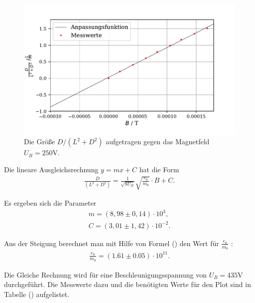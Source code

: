 \begin{figure}[H]
  \centering
  \includegraphics{plot1.pdf}
  \caption{Die Größe $D/(L^2+D^2)$ aufgetragen gegen das Magnetfeld $U_B = 250\si{\volt}$.}
  \label{fig:plot}
\end{figure}

Die lineare Ausgleichsrechnung $y = mx+C$ hat die Form
\begin{align*}
    \frac{D}{(L^2+D^2)} = \frac{1}{\sqrt{8U_B}}\sqrt{\frac{e_0}{m_0}} \cdot B + C .
\end{align*}

Es ergeben sich die Parameter
\begin{align*}
    m = (8,98 \pm 0,14) \cdot 10^{3} ,\\
    C = (3,01 \pm 1,42) \cdot 10^{-2} .
\end{align*}

Aus der Steigung berechnet man mit Hilfe von Formel () den Wert für $\frac{e_0}{m_0}$ :
\begin{align*}
\frac{e_0}{m_0} = (1.61 \pm 0.05) \cdot 10^{11} .
\end{align*}

\noindent Die Gleiche Rechnung wird für eine Beschleunigungsspannung von $U_B = 435\si{\volt}$ durchgeführt. Die Messwerte dazu und die benötigten Werte für den Plot sind in Tabelle () aufgelistet.


